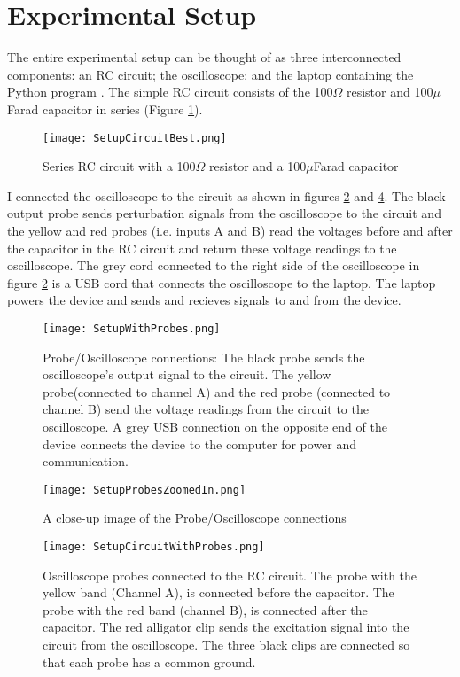 	\section{Experimental Setup}
The entire experimental setup can be thought of as three interconnected components: an RC circuit; the oscilloscope; and the laptop containing the Python program%
. The simple RC circuit consists of the 100$\Omega$ resistor and 100$\mu$Farad capacitor in series (Figure \ref{Circuit}). \newline 
\begin{figure}[H]
\texttt{[image: SetupCircuitBest.png]}
\caption{Series RC circuit with a 100$\Omega$ resistor and a 100$\mu$Farad capacitor
\label{Circuit}}
\end{figure}
I connected the oscilloscope to the circuit as shown in figures \ref{SetupWithProbesUSB} and \ref{CircuitWithProbes}.\newline
The black output probe sends perturbation signals from the oscilloscope to the circuit and the yellow and red probes (i.e. inputs A and B) read the voltages before and after the capacitor in the RC circuit and return these voltage readings to the oscilloscope. The grey cord connected to the right side of the oscilloscope in figure \ref{SetupWithProbesUSB} is a USB cord that connects the oscilloscope to the laptop. The laptop powers the device and  sends and recieves signals to and from the device. 
\begin{figure}[H]
\texttt{[image: SetupWithProbes.png]}
\caption{Probe/Oscilloscope connections: The black probe sends the oscilloscope's output signal to the circuit. The yellow probe(connected to channel A) and the red probe (connected to channel B) send the voltage readings from the circuit to the oscilloscope. A grey USB connection on the opposite end of the device connects the device to the computer for power and communication.
\label{SetupWithProbesUSB}}
\end{figure}

\begin{figure}[H]
\texttt{[image: SetupProbesZoomedIn.png]}
\caption{A close-up image of the Probe/Oscilloscope connections
\label{OscopeWithProbes}}
\end{figure}

\begin{figure}[H]
\texttt{[image: SetupCircuitWithProbes.png]}
\caption{Oscilloscope probes connected to the RC circuit. The probe with the yellow band (Channel A),  is connected before the capacitor. The probe  with the red band (channel B), is connected after the capacitor. The red alligator clip sends the excitation signal into the circuit from the oscilloscope. The three black clips are connected so that each probe has a common ground.
\label{CircuitWithProbes}}
\end{figure}

